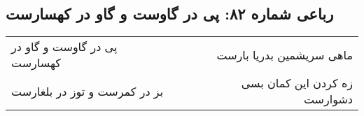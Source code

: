\begin{center}
\section*{رباعی شماره ۸۲: پی در گاوست و گاو در کهسارست}
\label{sec:sh082}
\begin{longtable}{l p{0.5cm} r}
پی در گاوست و گاو در کهسارست
&&
ماهی سریشمین بدریا بارست
\\
بز در کمرست و توز در بلغارست
&&
زه کردن این کمان بسی دشوارست
\\
\end{longtable}
\end{center}
